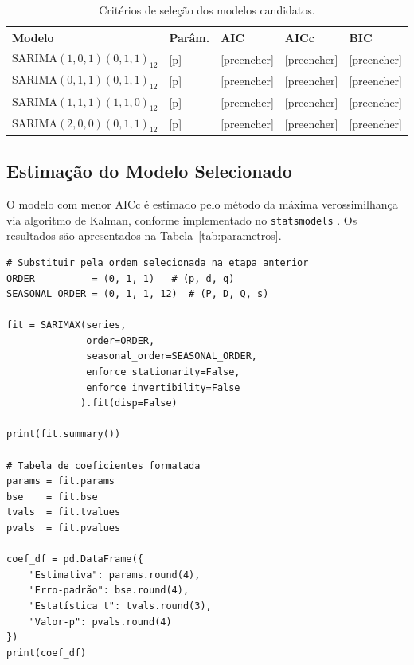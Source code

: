 \documentclass[12pt, a4paper]{article}
\begin{document}
\begin{table}[H]
  \centering
  \caption{Critérios de seleção dos modelos candidatos.}
  \label{tab:criterios}
  \begin{tabularx}{\textwidth}{lXXXX}
    \toprule
    \textbf{Modelo} & \textbf{Parâm.} & \textbf{AIC}
      & \textbf{AICc} & \textbf{BIC} \\
    \midrule
    $\mathrm{SARIMA}(1,0,1)(0,1,1)_{12}$ & [p] & [preencher]
      & [preencher] & [preencher] \\
    $\mathrm{SARIMA}(0,1,1)(0,1,1)_{12}$ & [p] & [preencher]
      & [preencher] & [preencher] \\
    $\mathrm{SARIMA}(1,1,1)(1,1,0)_{12}$ & [p] & [preencher]
      & [preencher] & [preencher] \\
    $\mathrm{SARIMA}(2,0,0)(0,1,1)_{12}$ & [p] & [preencher]
      & [preencher] & [preencher] \\
    \bottomrule
  \end{tabularx}
\end{table}

\subsection{Estimação do Modelo Selecionado}

O modelo com menor AICc é estimado pelo método da máxima verossimilhança via algoritmo
de Kalman, conforme implementado no \texttt{statsmodels} \cite{StatsmodelsRef}. Os
resultados são apresentados na Tabela~\ref{tab:parametros}.

\begin{lstlisting}[caption={Estimação do modelo selecionado.},
                   label={lst:estimacao}]
# Substituir pela ordem selecionada na etapa anterior
ORDER          = (0, 1, 1)   # (p, d, q)
SEASONAL_ORDER = (0, 1, 1, 12)  # (P, D, Q, s)

fit = SARIMAX(series,
              order=ORDER,
              seasonal_order=SEASONAL_ORDER,
              enforce_stationarity=False,
              enforce_invertibility=False
             ).fit(disp=False)

print(fit.summary())

# Tabela de coeficientes formatada
params = fit.params
bse    = fit.bse
tvals  = fit.tvalues
pvals  = fit.pvalues

coef_df = pd.DataFrame({
    "Estimativa": params.round(4),
    "Erro-padrão": bse.round(4),
    "Estatística t": tvals.round(3),
    "Valor-p": pvals.round(4)
})
print(coef_df)
\end{lstlisting}
\end{document}
